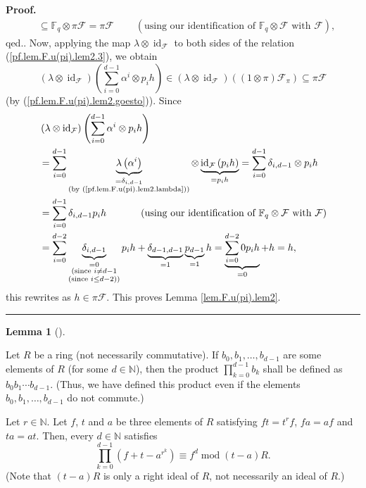 \documentclass[numbers=enddot,12pt,final,onecolumn,notitlepage]{scrartcl}%
\theoremstyle{definition}
\newtheorem{lem}[theo]{Lemma}
\newenvironment{lemma}[1][]
{\begin{lem}[#1]\begin{leftbar}}
{\end{leftbar}\end{lem}}
\newenvironment{proof}[1][Proof]{\noindent\textbf{#1.} }{\ \rule{0.5em}{0.5em}}
\let\sumnonlimits\sum
\let\prodnonlimits\prod
\renewcommand{\sum}{\sumnonlimits\limits}
\renewcommand{\prod}{\prodnonlimits\limits}
\begin{document}
\begin{proof}
{\begin{align*}
&  \subseteq\mathbb{F}_{q}\otimes\pi\mathcal{F}=\pi\mathcal{F}%
\ \ \ \ \ \ \ \ \ \ \left(  \text{using our identification of }\mathbb{F}%
_{q}\otimes\mathcal{F}\text{ with }\mathcal{F}\right)  ,
\end{align*}
qed.}. Now, applying the map $\lambda\otimes\operatorname*{id}%
\nolimits_{\mathcal{F}}$ to both sides of the relation
(\ref{pf.lem.F.u(pi).lem2.3}), we obtain%
\[
\left(  \lambda\otimes\operatorname*{id}\nolimits_{\mathcal{F}}\right)
\left(  \sum_{i=0}^{d-1}\alpha^{i}\otimes p_{i}h\right)  \in\left(
\lambda\otimes\operatorname*{id}\nolimits_{\mathcal{F}}\right)  \left(
\left(  1\otimes\pi\right)  \mathcal{F}_{\pi}\right)  \subseteq\pi\mathcal{F}%
\]
(by (\ref{pf.lem.F.u(pi).lem2.goesto})). Since%
\begin{align*}
&  \left(  \lambda\otimes\operatorname*{id}\nolimits_{\mathcal{F}}\right)
\left(  \sum_{i=0}^{d-1}\alpha^{i}\otimes p_{i}h\right) \\
&  =\sum_{i=0}^{d-1}\underbrace{\lambda\left(  \alpha^{i}\right)
}_{\substack{=\delta_{i,d-1}\\\text{(by (\ref{pf.lem.F.u(pi).lem2.lambda}))}%
}}\otimes\underbrace{\operatorname*{id}\nolimits_{\mathcal{F}}\left(
p_{i}h\right)  }_{=p_{i}h}=\sum_{i=0}^{d-1}\delta_{i,d-1}\otimes p_{i}h\\
&  =\sum_{i=0}^{d-1}\delta_{i,d-1}p_{i}h\ \ \ \ \ \ \ \ \ \ \left(
\text{using our identification of }\mathbb{F}_{q}\otimes\mathcal{F}\text{ with
}\mathcal{F}\right) \\
&  =\sum_{i=0}^{d-2}\underbrace{\delta_{i,d-1}}_{\substack{=0\\\text{(since
}i\neq d-1\\\text{(since }i\leq d-2\text{))}}}p_{i}h+\underbrace{\delta
_{d-1,d-1}}_{=1}\underbrace{p_{d-1}}_{=1}h=\underbrace{\sum_{i=0}^{d-2}%
0p_{i}h}_{=0}+h=h,
\end{align*}
this rewrites as $h\in\pi\mathcal{F}$. This proves Lemma
\ref{lem.F.u(pi).lem2}.
\end{proof}

\begin{lemma}
\label{lem.F.u(pi).prod-deform}Let $R$ be a ring (not necessarily
commutative). If $b_{0},b_{1},\ldots,b_{d-1}$ are some elements of $R$ (for
some $d\in\mathbb{N}$), then the product $\prod_{k=0}^{d-1}b_{k}$ shall be
defined as $b_{0}b_{1}\cdots b_{d-1}$. (Thus, we have defined this product
even if the elements $b_{0},b_{1},\ldots,b_{d-1}$ do not commute.)

Let $r\in\mathbb{N}$. Let $f$, $t$ and $a$ be three elements of $R$ satisfying
$ft=t^{r}f$, $fa=af$ and $ta=at$. Then, every $d\in\mathbb{N}$ satisfies%
\begin{equation}
\prod_{k=0}^{d-1}\left(  f+t-a^{r^{k}}\right)  \equiv f^{d}\operatorname{mod}%
\left(  t-a\right)  R. \label{eq.lem.F.u(pi).prod-deform.1}%
\end{equation}
(Note that $\left(  t-a\right)  R$ is only a right ideal of $R$, not
necessarily an ideal of $R$.)
\end{lemma}
\end{document}
